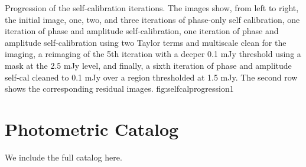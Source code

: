 \documentclass[twocolumn]{aastex61}
\begin{document}
{Progression of the self-calibration iterations.  The images show, from left to
right, the initial image, one, two, and three iterations of phase-only self
calibration, one iteration of phase and amplitude self-calibration, one
iteration of phase and amplitude self-calibration using two Taylor terms and
multiscale clean for the imaging, a reimaging of the 5th
iteration with a deeper 0.1 mJy threshold using a mask at the 2.5 mJy level,
and finally, a sixth iteration of phase and amplitude self-cal cleaned to
0.1 mJy over a region thresholded at 1.5 mJy.
The second row shows the corresponding residual images.}
{fig:selfcalprogression}{1}{\textwidth}

\section{Photometric Catalog}
We include the full catalog here.


\end{document}
